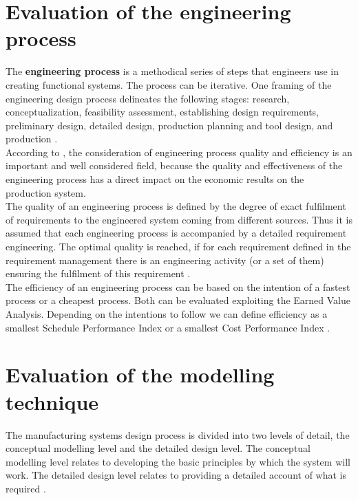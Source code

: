 \section{Evaluation of the engineering process}\label{section:eval_e_p}
The \textbf{engineering process} is a methodical series of steps that engineers use in creating functional systems. The process can be iterative. One framing of the engineering design process delineates the following stages: research, conceptualization, feasibility assessment, establishing design requirements, preliminary design, detailed design, production planning and tool design, and production \cite{wiki:engDesignProcess}.\\

 According to \cite{eval}, the consideration of engineering process quality and efficiency is an important and well considered field, because the quality and effectiveness of the engineering process has a direct impact on the economic results on the production system.\\ 
 
 The quality of an engineering process is defined by the degree of exact fulfilment of requirements to the engineered system coming from different sources. Thus it is assumed that each engineering process is accompanied by a detailed requirement engineering. The optimal quality is reached, if for each requirement defined in the requirement management there is an engineering activity (or a set of them) ensuring the fulfilment of this requirement \cite{eval}.\\

The efficiency of an engineering process can be based on the intention of a fastest process or a cheapest process. Both can be evaluated exploiting the Earned Value Analysis\cite{design.vdi2206}. Depending on the intentions to follow we can define efficiency as a smallest Schedule Performance Index or a smallest Cost Performance Index \cite{eval}.


\section{Evaluation of the modelling technique}\label{section:eval_m_t}
The manufacturing systems design process is divided into two levels of detail, the conceptual modelling level and the detailed design level. The conceptual modelling level relates to developing the basic principles by which the system will work. The detailed design level relates to providing a detailed account of what is required \cite{wu}. \\

